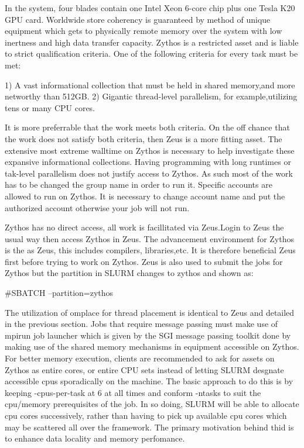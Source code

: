 \begin{Document}
In the system, four blades contain one Intel Xeon 6-core chip plus one Tesla K20 GPU card.
Worldwide store coherency is guaranteed by method of unique equipment which gets to physically remote memory over the system with low inertness and high data transfer capacity.
Zythos is a restricted asset and is liable to strict qualification criteria. 
One of the following criteria for every task must be met:

1) A vast informational collection that must be held in shared memory,and more networthy than 512GB.
2) Gigantic thread-level parallelism, for example,utilizing tens or many CPU cores.

It is more preferrable that the work meets both criteria. 
On the off chance that the work does not satisfy both criteria, then Zeus is a more fitting asset.
The extensive most extreme walltime on Zythos is necessary to help investigate these expansive informational collections.
Having programming with long runtimes or tak-level parallelism does not justify access to Zythos.
As such most of the work has to be changed the group name in order to run it. 
Specific accounts are allowed to run on Zythos. It is necessary to change account name and put the authorized account otherwise your job will not run.

Zythos has no direct access, all work is facillitated via Zeus.Login to Zeus the usual way then access Zythos in Zeus.
The advancement environment for Zythos is the as Zeus, this includes compilers, libraries,etc. 
It is therefore beneficial Zeus first before trying to work on Zythos.
Zeus is also used to submit the jobs for Zythos but the partition in SLURM changes to zythos and shown as:

#SBATCH --partition=zythos

The utilization of omplace for thread placement is identical to Zeus and detailed in the previous section.
Jobs that require message passing must make use of mpirun job launcher which is given by the SGI message passing toolkit done by making use of the shared memory mechanisms in equipment accessible on Zythos.
For better memory execution, clients are recommended to ask for assets on Zythos as entire cores, or entire CPU sets instead of letting SLURM desgnate accessible cpus sporadically on the machine. 
The basic approach to do this is by keeping -cpus-per-task at 6 at all times and conform -ntasks to suit the cpu/memory prerequisites of the job.
In so doing, SLURM will be able to allocate cpu cores successively, rather than having to pick up available cpu cores which may be scattered all over the framework.
The primary motivation behind thid is to enhance data locality and memory perfomance.


\end{Document}
